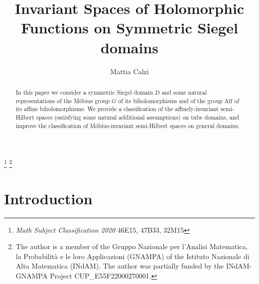 \documentclass[10.5pt,reqno]{amsart}
\title[Invariant Spaces of Holomorphic Functions]{Invariant Spaces of Holomorphic Functions on Symmetric Siegel domains}
\date{}
\newcommand{\Aff}{\mathrm{Aff}}
\begin{document}
\theoremstyle{definition}
\newtheorem{deff}{Definition}[section]

\newtheorem{oss}[deff]{Remark}

\newtheorem{ex}[deff]{Example}

\newtheorem{nott}[deff]{Notation}


\theoremstyle{plain}
\newtheorem{teo}[deff]{Theorem}

\newtheorem{lem}[deff]{Lemma}

\newtheorem{prop}[deff]{Proposition}

\newtheorem{cor}[deff]{Corollary}

\author[M. Calzi]{Mattia Calzi}


\address{Dipartimento di Matematica, Universit\`a degli Studi di
	Milano, Via C. Saldini 50, 20133 Milano, Italy}

\thanks{{\em Math Subject Classification 2020} 46E15, 47B33, 32M15 }
\thanks{The author is a member of the 	Gruppo Nazionale per l'Analisi Matematica, la Probabilit\`a e le	loro Applicazioni (GNAMPA) of the Istituto Nazionale di Alta	Matematica (INdAM).   The author was partially funded by the INdAM-GNAMPA Project CUP\_E55F22000270001. 
} 

\begin{abstract}
	In this paper we consider a symmetric Siegel domain $D$ and some natural representations of the M\"obius group $G$ of its biholomorphisms and of the group $\Aff$ of its affine biholomorphisms. We provide a  classification of  the affinely-invariant semi-Hilbert spaces (satisfying some natural additional assumptions) on tube domains,  and improve the classification of M\"obius-invariant  semi-Hilbert spaces on general domains.
\end{abstract}
\maketitle


\section{Introduction}
\end{document}
